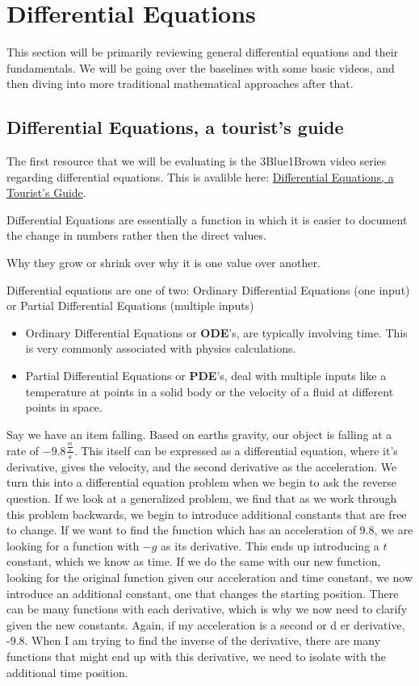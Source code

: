 \documentclass[10pt, oneside]{report}
\begin{document}
\section{Differential Equations}
This section will be primarily reviewing general differential equations and their fundamentals.  We will be going over the baselines with some basic videos, and then diving into more traditional mathematical approaches after that.  
\subsection{Differential Equations, a tourist's guide}
The first resource that we will be evaluating is the 3Blue1Brown video series regarding differential equations. This is avalible here: \href{https://www.youtube.com/watch?v=p_di4Zn4wz4&list=PLZHQObOWTQDNPOjrT6KVlfJuKtYTftqH6}{Differential Equations, a Tourist's Guide}.

Differential Equations are essentially a function in which it is easier to document the change in numbers rather then the direct values.  

Why they grow or shrink over why it is one value over another.

Differential equations are one of two:
Ordinary Differential Equations (one input) or Partial Differential Equations (multiple inputs)
\begin{itemize}
    \item Ordinary Differential Equations or \textbf{ODE}'s, are typically involving time.  This is very commonly associated with physics calculations.  
    \item Partial Differential Equations or \textbf{PDE}'s, deal with multiple inputs like a temperature at points in a solid body or the velocity of a fluid at different points in space. 
\end{itemize}
Say we have an item falling.  Based on earths gravity, our object is falling at a rate of $-9.8 \frac{\frac{m}{s}}{s}$.  This itself can be expressed as a differential equation, where it's derivative, gives the velocity, and the second derivative as the acceleration.  
We turn this into a differential equation problem when we begin to ask the reverse question.  If we look at a generalized problem, we find that as we work through this problem backwards, we begin to introduce additional constants that are free to change.  If we want to find the function which has an acceleration of 9.8, we are looking for a function with $-g$ as its derivative.  This ends up introducing a $t$ constant, which we know as time.  If we do the same with our new function, looking for the original function given our acceleration and time constant, we now introduce an additional constant, one that changes the starting position. 
There can be many functions with each derivative, which is why we now need to clarify given the new constants.  
Again, if my acceleration is a second or d er derivative, -9.8.  When I am trying to find the inverse of the derivative, there are many functions that might end up with this derivative, we need to isolate with the additional time position. 
\end{document}
